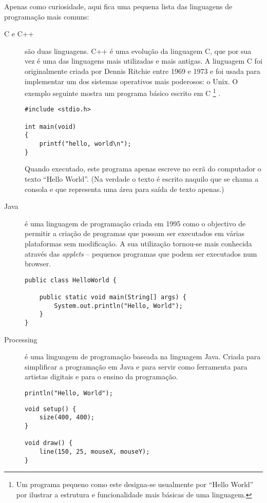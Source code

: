Apenas como curiosidade, aqui fica uma pequena lista das linguagens de programação mais comuns:
\begin{description}

\item[C e C++] são duas linguagens. C++ é uma evolução da linguagem C, que por sua vez é uma das linguagens mais utilizadas e mais antigas. A linguagem C foi originalmente criada por Dennis Ritchie entre 1969 e 1973 e foi usada para implementar um dos sistemas operativos mais poderosos: o Unix. O exemplo seguinte mostra um programa básico escrito em C%
\footnote{
Um programa pequeno como este designa-se usualmente por ``Hello World'' por ilustrar a estrutura e funcionalidade mais básicas de uma linguagem.
}%
.
\begin{lstlisting}
#include <stdio.h>
 
int main(void)
{
    printf("hello, world\n");
}
\end{lstlisting}
Quando executado, este programa apenas escreve no ecrã do computador o texto ``Hello World''. (Na verdade o texto é escrito naquilo que se chama a consola e que representa uma área para saída de texto apenas.)

\item[Java] é uma linguagem de programação criada em 1995 como o objectivo de permitir a criação de programas que possam ser executados em várias plataformas sem modificação. A sua utilização tornou-se mais conhecida através das \emph{applets} -- pequenos programas que podem ser executados num browser. 
\begin{lstlisting}
public class HelloWorld {

    public static void main(String[] args) {
        System.out.println("Hello, World");
    }
}
\end{lstlisting}

\item[Processing] é uma linguagem de programação baseada na linguagem Java. Criada para simplificar a programação em Java e para servir como ferramenta para artistas digitais e para o ensino da programação.
\begin{lstlisting}
println("Hello, World");
\end{lstlisting}
\begin{lstlisting}
void setup() {
	size(400, 400);
}
 
void draw() {
	line(150, 25, mouseX, mouseY);
}
\end{lstlisting}


\end{description}
